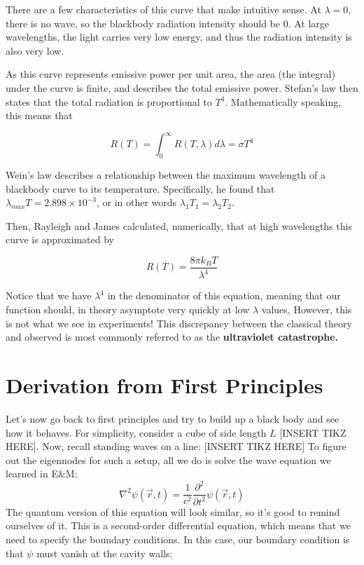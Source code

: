         There are a few characteristics of this curve that make intuitive sense. At $\lambda = 0$, there is no wave, so the blackbody radiation intensity should be 0. At large wavelengths, the light carries very low energy, and thus the radiation intensity is also very low.

        As this curve represents emissive power per unit area, the area (the integral) under the curve is finite, and describes the total emissive power. Stefan's law then states that the total radiation is proportional to $T^4$. Mathematically speaking, this means that

        \[ R(T) = \int_0^\infty R(T, \lambda) d\lambda = \sigma T^4\]

        Wein's law describes a relationship between the maximum wavelength of a blackbody curve to its temperature. Specifically, he found that $\lambda_{max}T = 2.898 \times 10^{-3}$, or in other words $\lambda_1 T_1 = \lambda_2T_2$.

        Then, Rayleigh and James calculated, numerically, that at high wavelengths this curve is approximated by

        \begin{equation}\label{classical blackbody equation}
        R(T) = \frac{8\pi k_B T}{\lambda^4}
        \end{equation}

        Notice that we have $\lambda^4$ in the denominator of this equation, meaning that our function should, in theory asymptote very quickly at low $\lambda$ values, However, this is not what we see in experiments! This discrepancy between the classical theory and observed is most commonly referred to as the \textbf{ultraviolet catastrophe.}

      \section{Derivation from First Principles}

      Let's now go back to first principles and try to build up a black body and see how it behaves. For simplicity, consider a cube of side length $L$ [INSERT TIKZ HERE]. Now, recall standing waves on a line: [INSERT TIKZ HERE] To figure out the eigennodes for such a setup, all we do is solve the wave equation we learned in E\&M:
      $$\nabla^2\psi(\vec{r},t) = \frac{1}{c^2}\frac{\partial^2}{\partial t^2}\psi(\vec{r},t)$$
      The quantum version of this equation will look similar, so it's good to remind ourselves of it. This is a second-order differential equation, which means that we need to specify the boundary conditions. In this case, our boundary condition is that $\psi$ must vanish at the cavity walls:

